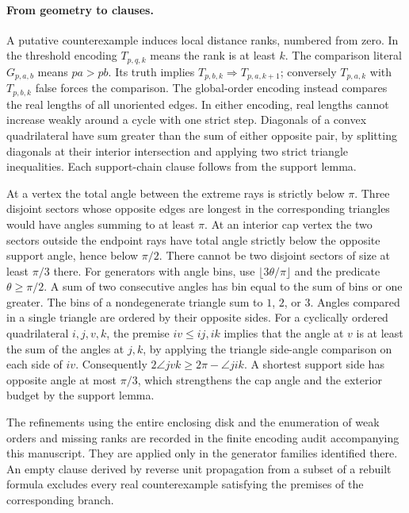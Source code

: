 \paragraph{From geometry to clauses.}
A putative counterexample induces local distance ranks, numbered from zero. In the threshold encoding \(T_{p,q,k}\) means the rank is at least \(k\). The comparison literal \(G_{p,a,b}\) means \(pa>pb\). Its truth implies \(T_{p,b,k}\Rightarrow T_{p,a,k+1}\); conversely \(T_{p,a,k}\) with \(T_{p,b,k}\) false forces the comparison. The global-order encoding instead compares the real lengths of all unoriented edges. In either encoding, real lengths cannot increase weakly around a cycle with one strict step. Diagonals of a convex quadrilateral have sum greater than the sum of either opposite pair, by splitting diagonals at their interior intersection and applying two strict triangle inequalities. Each support-chain clause follows from the support lemma.

At a vertex the total angle between the extreme rays is strictly below \(\pi\). Three disjoint sectors whose opposite edges are longest in the corresponding triangles would have angles summing to at least \(\pi\). At an interior cap vertex the two sectors outside the endpoint rays have total angle strictly below the opposite support angle, hence below \(\pi/2\). There cannot be two disjoint sectors of size at least \(\pi/3\) there. For generators with angle bins, use \(\lfloor 3\theta/\pi\rfloor\) and the predicate \(\theta\ge\pi/2\). A sum of two consecutive angles has bin equal to the sum of bins or one greater. The bins of a nondegenerate triangle sum to \(1\), \(2\), or \(3\). Angles compared in a single triangle are ordered by their opposite sides. For a cyclically ordered quadrilateral \(i,j,v,k\), the premise \(iv\le ij,ik\) implies that the angle at \(v\) is at least the sum of the angles at \(j,k\), by applying the triangle side-angle comparison on each side of \(iv\). Consequently \(2\angle jvk\ge2\pi-\angle jik\). A shortest support side has opposite angle at most \(\pi/3\), which strengthens the cap angle and the exterior budget by the support lemma.

The refinements using the entire enclosing disk and the enumeration of weak orders and missing ranks are recorded in the finite encoding audit accompanying this manuscript. They are applied only in the generator families identified there. An empty clause derived by reverse unit propagation from a subset of a rebuilt formula excludes every real counterexample satisfying the premises of the corresponding branch.

